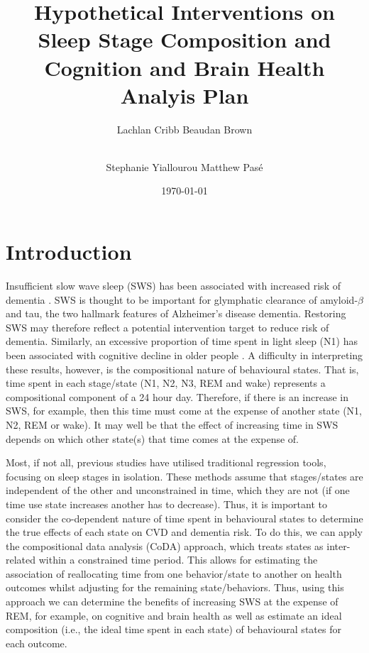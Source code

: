 \documentclass{article}
\title{\textbf{Hypothetical Interventions on Sleep Stage Composition and Cognition and Brain Health} \protect\\ Analyis Plan}
\author{Lachlan Cribb \hspace{0.25cm} Beaudan Brown \and \\Stephanie Yiallourou \hspace{0.25cm} Matthew Pas\'e}
\date{\today}
\begin{document}
\maketitle

\section{Introduction}
Insufficient slow wave sleep (SWS) has been associated with increased risk of dementia \cite{himali_association_2023}. SWS is thought to be important for glymphatic clearance of amyloid-$\beta$ and tau, the two hallmark features of Alzheimer's disease dementia. Restoring SWS may therefore reflect a potential intervention target to reduce risk of dementia. Similarly, an excessive proportion of time spent in light sleep (N1) has been associated with cognitive decline in older people \cite{song_relationships_2015}. A difficulty in interpreting these results, however, is the compositional nature of behavioural states. That is, time spent in each stage/state (N1, N2, N3, REM and wake) represents a compositional component of a 24 hour day. Therefore, if there is an increase in SWS, for example, then this time must come at the expense of another state (N1, N2, REM or wake). It may well be that the effect of increasing time in SWS depends on which other state(s) that time comes at the expense of.

Most, if not all, previous studies have utilised traditional regression tools, focusing on sleep stages in isolation. These methods assume that stages/states are independent of the other and unconstrained in time, which they are not (if one time use state increases another has to decrease). Thus, it is important to consider the co-dependent nature of time spent in behavioural states to determine the true effects of each state on CVD and dementia risk. To do this, we can apply the compositional data analysis (CoDA) approach, which treats states as inter-related within a constrained time period. This allows for estimating the association of reallocating time from one behavior/state to another on health outcomes whilst adjusting for the remaining state/behaviors. Thus, using this approach we can determine the benefits of increasing SWS at the expense of REM, for example, on cognitive and brain health as well as estimate an ideal composition (i.e., the ideal time spent in each state) of behavioural states for each outcome.
\end{document}
